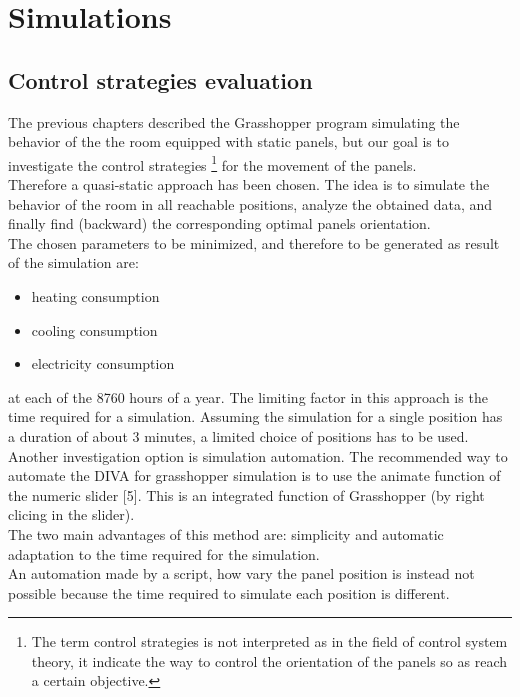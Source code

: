 \chapter{Simulations}
\section{Control strategies evaluation}
The previous chapters described the Grasshopper program simulating the behavior of the the room equipped with static panels, but our goal is to investigate the control strategies \footnote{The term control strategies is not interpreted as in the field of control system theory, it indicate the way to control the orientation of the panels so as reach a certain objective.} for the movement of the panels.\\
Therefore a quasi-static approach has been chosen. The idea is to simulate the behavior of the room in all reachable positions, analyze the obtained data, and finally find (backward) the corresponding optimal panels orientation.\\
The chosen parameters to be minimized, and therefore to be generated as result of the simulation are:
\begin{itemize}
\item heating consumption
\item cooling consumption
\item electricity consumption
\end{itemize}
at each of the 8760 hours of a year.
The limiting factor in this approach is the time required for a simulation.
Assuming the simulation for a single position has a duration of about 3 minutes, a limited choice of positions has to be used.\\
Another investigation option is simulation automation. The recommended way to automate the DIVA for grasshopper simulation is to use the animate function of the numeric slider [5]. This is an integrated function of Grasshopper (by right clicing in the slider).\\
The two main advantages of this method are: simplicity and automatic adaptation to the time required for the simulation.\\
An automation made by a script, how vary the panel position is instead not possible because the time required to simulate each position is different.

